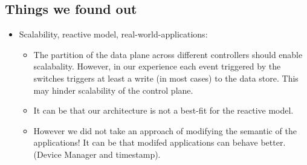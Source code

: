 \subsection{Things we found out}
\begin{itemize}
\item Scalability, reactive model, real-world-applications: 
  \begin{itemize}
  \item The partition of the data plane across different controllers should enable scalabality. However, in our experience each event triggered by the switches triggers at least a write (in most cases) to the data store. This may hinder scalability of the control plane. 
  \item It can be that our architecture is not a best-fit for the reactive model. 
  \item However we did not take an approach of modifying  the semantic of the applications! It can be that modifed applications can behave better. (Device Manager and timestamp).  
  \end{itemize}
\end{itemize}

